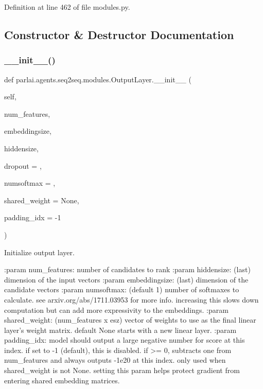 Definition at line 462 of file modules.\+py.



\subsection{Constructor \& Destructor Documentation}
\mbox{\label{classparlai_1_1agents_1_1seq2seq_1_1modules_1_1OutputLayer_ae79d593ea8038932fc431369de1fa91d}} 
\subsubsection{\texorpdfstring{\+\_\+\+\_\+init\+\_\+\+\_\+()}{\_\_init\_\_()}}
{\footnotesize\ttfamily def parlai.\+agents.\+seq2seq.\+modules.\+Output\+Layer.\+\_\+\+\_\+init\+\_\+\+\_\+ (\begin{DoxyParamCaption}\item[{}]{self,  }\item[{}]{num\+\_\+features,  }\item[{}]{embeddingsize,  }\item[{}]{hiddensize,  }\item[{}]{dropout = {},  }\item[{}]{numsoftmax = {},  }\item[{}]{shared\+\_\+weight = {\ttfamily None},  }\item[{}]{padding\+\_\+idx = {\ttfamily -\/1} }\end{DoxyParamCaption})}

\begin{DoxyVerb}Initialize output layer.

:param num_features:  number of candidates to rank
:param hiddensize:    (last) dimension of the input vectors
:param embeddingsize: (last) dimension of the candidate vectors
:param numsoftmax:   (default 1) number of softmaxes to calculate.
              see arxiv.org/abs/1711.03953 for more info.
              increasing this slows down computation but can
              add more expressivity to the embeddings.
:param shared_weight: (num_features x esz) vector of weights to use as
              the final linear layer's weight matrix. default
              None starts with a new linear layer.
:param padding_idx:   model should output a large negative number for
              score at this index. if set to -1 (default),
              this is disabled. if >= 0, subtracts one from
              num_features and always outputs -1e20 at this
              index. only used when shared_weight is not None.
              setting this param helps protect gradient from
              entering shared embedding matrices.
\end{DoxyVerb}
 

